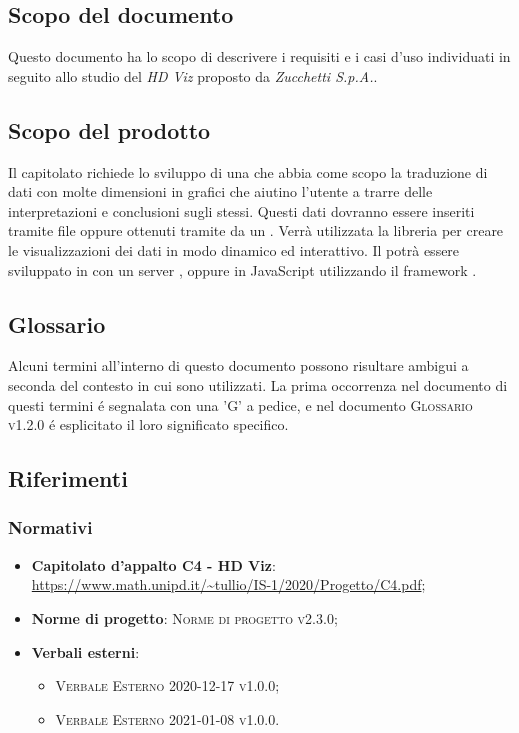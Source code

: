 \documentclass[../analisi_dei_requisiti.tex]{subfiles}
\begin{document}
\subsection{Scopo del documento}%
\label{sub:scopo_del_documento}
Questo documento ha lo scopo di descrivere i requisiti e i casi d'uso individuati in seguito allo studio del  \emph{HD Viz} proposto da \emph{Zucchetti S.p.A.}. 

\subsection{Scopo del prodotto}%
\label{sub:scopo_del_prodotto}
Il capitolato richiede lo sviluppo di una  che abbia come scopo la 
traduzione di dati con molte dimensioni in grafici che aiutino l’utente a trarre delle interpretazioni e conclusioni sugli stessi. 
Questi dati dovranno essere inseriti tramite file  oppure ottenuti tramite  da un .
Verrà utilizzata la libreria   per creare le visualizzazioni dei dati in modo dinamico ed interattivo.
Il  potrà essere sviluppato in  con un server ,  oppure 
in JavaScript utilizzando il framework . 


\subsection{Glossario}
\label{sub:glossario}
Alcuni termini all'interno di questo documento possono risultare ambigui a seconda del contesto in cui sono utilizzati.
La prima occorrenza nel documento di questi termini é segnalata con una 'G' a pedice, e nel documento 
\textsc{Glossario v1.2.0} é esplicitato il loro significato specifico.


\subsection{Riferimenti}
\label{sub:riferimenti}

\subsubsection{Normativi}%
\label{ssub:normativi}


\begin{itemize}
  \item \textbf{Capitolato d'appalto C4 - HD Viz}: \\
  \url{https://www.math.unipd.it/~tullio/IS-1/2020/Progetto/C4.pdf};
  \item \textbf{Norme di progetto}: \textsc{Norme di progetto v2.3.0};
  \item \textbf{Verbali esterni}:
  \begin{itemize}
    \item \textsc{Verbale Esterno 2020-12-17 v1.0.0};
    \item \textsc{Verbale Esterno 2021-01-08 v1.0.0}.
  \end{itemize}
\end{itemize}
\end{document}
